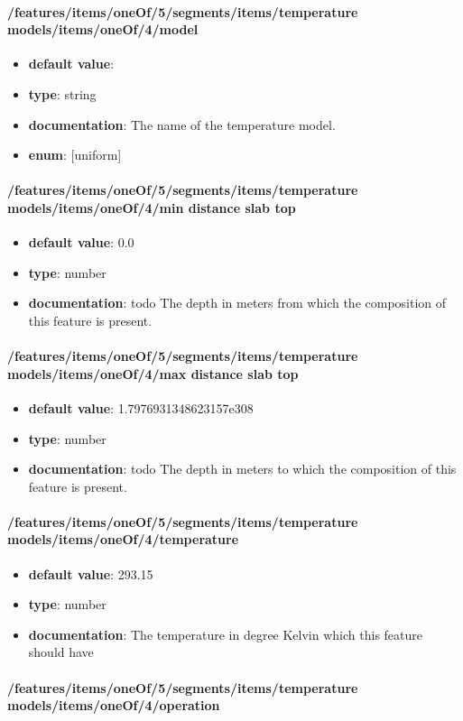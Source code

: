 \paragraph{/features/items/oneOf/5/segments/items/temperature models/items/oneOf/4/model}
\begin{itemize}\item {\bf default value}: 
\item {\bf type}: string
\item {\bf documentation}: The name of the temperature model.
\item {\bf enum}: [uniform]\end{itemize}\paragraph{/features/items/oneOf/5/segments/items/temperature models/items/oneOf/4/min distance slab top}
\begin{itemize}\item {\bf default value}: 0.0
\item {\bf type}: number
\item {\bf documentation}: todo The depth in meters from which the composition of this feature is present.
\end{itemize}\paragraph{/features/items/oneOf/5/segments/items/temperature models/items/oneOf/4/max distance slab top}
\begin{itemize}\item {\bf default value}: 1.7976931348623157e308
\item {\bf type}: number
\item {\bf documentation}: todo The depth in meters to which the composition of this feature is present.
\end{itemize}\paragraph{/features/items/oneOf/5/segments/items/temperature models/items/oneOf/4/temperature}
\begin{itemize}\item {\bf default value}: 293.15
\item {\bf type}: number
\item {\bf documentation}: The temperature in degree Kelvin which this feature should have
\end{itemize}\paragraph{/features/items/oneOf/5/segments/items/temperature models/items/oneOf/4/operation}
